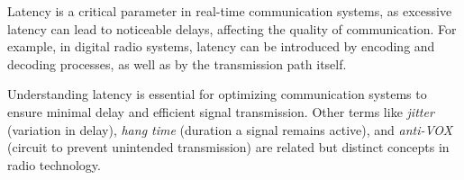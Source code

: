 Latency is a critical parameter in real-time communication systems, as excessive latency can lead to noticeable delays, affecting the quality of communication. For example, in digital radio systems, latency can be introduced by encoding and decoding processes, as well as by the transmission path itself.

Understanding latency is essential for optimizing communication systems to ensure minimal delay and efficient signal transmission. Other terms like \textit{jitter} (variation in delay), \textit{hang time} (duration a signal remains active), and \textit{anti-VOX} (circuit to prevent unintended transmission) are related but distinct concepts in radio technology.

